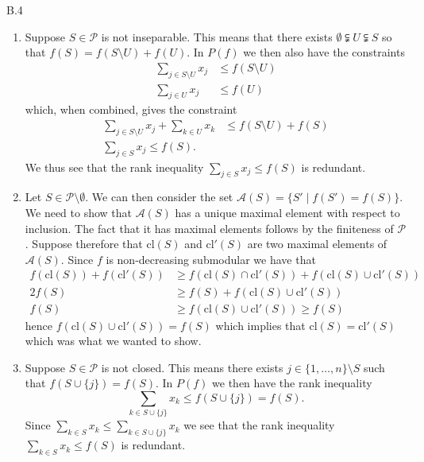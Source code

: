 \documentclass[a4paper]{article}
\begin{document}
  \begin{exercise}{B.4}
    \begin{enumerate}[label=(\roman*)]
    \item Suppose $ S \in \mathcal{P} $ is not inseparable. This means that there exists $ \emptyset \subsetneqq U \subsetneqq S $ so that $ f(S) = f(S \setminus U) + f(U) $. In $ P(f) $ we then also have the constraints
      \begin{align*}
        \sum_{j \in S \setminus U} x_j &\leq f(S\setminus U) \\
        \sum_{j \in U} x_j &\leq f(U)
      \end{align*}
      which, when combined, gives the constraint
      \begin{align*}
        \sum_{j \in S\setminus U} x_j + \sum_{k \in U} x_k &\leq f(S\setminus U) + f(S) \\
        \sum_{j \in S} x_j \leq f(S)
      .\end{align*}
      We thus see that the rank inequality $ \sum_{j \in S} x_j \leq f(S) $ is redundant.

    \item Let $ S \in \mathcal{P} \setminus \emptyset $. We can then consider the set $ \mathcal{A}(S) = \{S' \mid f(S')=f(S)\} $. We need to show that $ \mathcal{A}(S) $ has a unique maximal element with respect to inclusion. The fact that it has maximal elements follows by the finiteness of $ \mathcal{P} $. Suppose therefore that $ \text{cl}(S) $ and $ \text{cl}'(S) $ are two maximal elements of $ \mathcal{A}(S) $. Since $ f $ is non-decreasing submodular we have that
      \begin{align*}
        f(\text{cl}(S)) + f(\text{cl}'(S)) &\geq f(\text{cl}(S)\cap\text{cl}'(S)) + f(\text{cl}(S) \cup \text{cl}'(S)) \\
        2f(S) &\geq f(S) + f(\text{cl}(S) \cup \text{cl}'(S)) \\
        f(S) & \geq f(\text{cl}(S) \cup \text{cl}'(S)) \geq f(S)
      \end{align*}
      hence $ f(\text{cl}(S) \cup \text{cl}'(S)) = f(S) $ which implies that $ \text{cl}(S) = \text{cl}'(S) $ which was what we wanted to show.

    \item Suppose $ S \in \mathcal{P} $ is not closed. This means there exists $ j \in \{1, \ldots, n\} \setminus S $ such that $ f(S \cup \{j\}) = f(S) $. In $ P(f) $ we then have the rank inequality
      \begin{equation*}
      \sum_{k \in S \cup \{j\}} x_k \leq f(S \cup \{j\}) = f(S)
      .\end{equation*}
      Since $ \sum_{k \in S} x_k \leq \sum_{k \in S \cup \{j\}} x_k $ we see that the rank inequality $ \sum_{k \in S} x_k \leq f(S) $ is redundant.
    \end{enumerate}
  \end{exercise}
\end{document}

